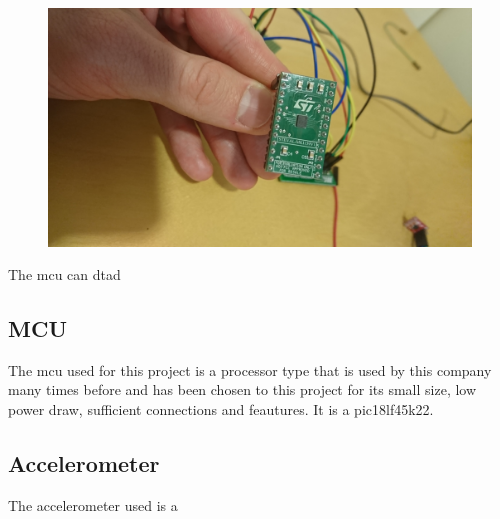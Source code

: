 \begin{figure}[H] 
\centering 
\includegraphics[width=.8\linewidth]{Figures/DSC_0103} 
\label{rattbo} 
\end{figure} 

The \gls{mcu} can dtad

\subsection{MCU}
The \gls{mcu} used for this project is a processor type that is used by this company many times before and has been chosen to this project for its small size, low power draw, sufficient connections and feautures. It is a pic18lf45k22\cite{pic18}.


\subsection{Accelerometer}
The accelerometer used is a 
